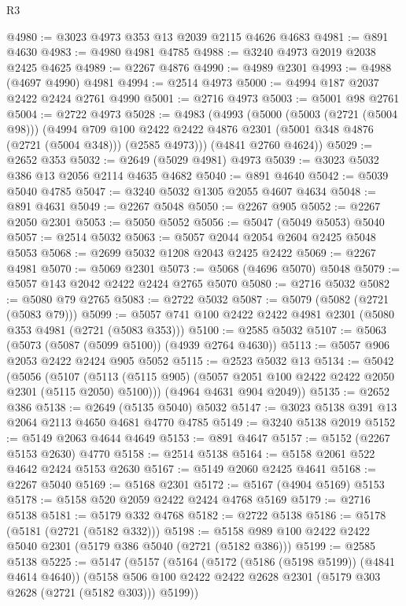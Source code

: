 \begin{lexlean}{R3}
\begin{coremodule}
@4980 := @3023 @4973 @353 @13 @2039 @2115 @4626 @4683
@4981 := @891 @4630
@4983 := @4980 @4981 @4785
@4988 := @3240 @4973 @2019 @2038 @2425 @4625
@4989 := @2267 @4876
@4990 := @4989 @2301
@4993 := @4988 (@4697 @4990) @4981
@4994 := @2514 @4973
@5000 := @4994 @187 @2037 @2422 @2424 @2761 @4990
@5001 := @2716 @4973
@5003 := @5001 @98 @2761
@5004 := @2722 @4973
@5028 := @4983
    (@4993
      (@5000
        (@5003 (@2721 (@5004 @98)))
        (@4994
          @709
          @100
          @2422
          @2422
          @4876
          @2301
          (@5001 @348 @4876 (@2721 (@5004 @348)))
          (@2585 @4973)))
      (@4841 @2760 @4624))
@5029 := @2652 @353
@5032 := @2649 (@5029 @4981) @4973
@5039 := @3023 @5032 @386 @13 @2056 @2114 @4635 @4682
@5040 := @891 @4640
@5042 := @5039 @5040 @4785
@5047 := @3240 @5032 @1305 @2055 @4607 @4634
@5048 := @891 @4631
@5049 := @2267 @5048
@5050 := @2267 @905
@5052 := @2267 @2050 @2301
@5053 := @5050 @5052
@5056 := @5047 (@5049 @5053) @5040
@5057 := @2514 @5032
@5063 := @5057 @2044 @2054 @2604 @2425 @5048 @5053
@5068 := @2699 @5032 @1208 @2043 @2425 @2422
@5069 := @2267 @4981
@5070 := @5069 @2301
@5073 := @5068 (@4696 @5070) @5048
@5079 := @5057 @143 @2042 @2422 @2424 @2765 @5070
@5080 := @2716 @5032
@5082 := @5080 @79 @2765
@5083 := @2722 @5032
@5087 := @5079 (@5082 (@2721 (@5083 @79)))
@5099 := @5057 @741 @100 @2422 @2422 @4981 @2301 (@5080 @353 @4981 (@2721 (@5083 @353)))
@5100 := @2585 @5032
@5107 := @5063 (@5073 (@5087 (@5099 @5100)) (@4939 @2764 @4630))
@5113 := @5057 @906 @2053 @2422 @2424 @905 @5052
@5115 := @2523 @5032 @13
@5134 := @5042
    (@5056
      (@5107 (@5113 (@5115 @905) (@5057 @2051 @100 @2422 @2422 @2050 @2301 (@5115 @2050) @5100)))
      (@4964 @4631 @904 @2049))
@5135 := @2652 @386
@5138 := @2649 (@5135 @5040) @5032
@5147 := @3023 @5138 @391 @13 @2064 @2113 @4650 @4681 @4770 @4785
@5149 := @3240 @5138 @2019
@5152 := @5149 @2063 @4644 @4649
@5153 := @891 @4647
@5157 := @5152 (@2267 @5153 @2630) @4770
@5158 := @2514 @5138
@5164 := @5158 @2061 @522 @4642 @2424 @5153 @2630
@5167 := @5149 @2060 @2425 @4641
@5168 := @2267 @5040
@5169 := @5168 @2301
@5172 := @5167 (@4904 @5169) @5153
@5178 := @5158 @520 @2059 @2422 @2424 @4768 @5169
@5179 := @2716 @5138
@5181 := @5179 @332 @4768
@5182 := @2722 @5138
@5186 := @5178 (@5181 (@2721 (@5182 @332)))
@5198 := @5158 @989 @100 @2422 @2422 @5040 @2301 (@5179 @386 @5040 (@2721 (@5182 @386)))
@5199 := @2585 @5138
@5225 := @5147
    (@5157
      (@5164
        (@5172 (@5186 (@5198 @5199)) (@4841 @4614 @4640))
        (@5158 @506 @100 @2422 @2422 @2628 @2301 (@5179 @303 @2628 (@2721 (@5182 @303))) @5199))

\end{coremodule}
\end{lexlean}
